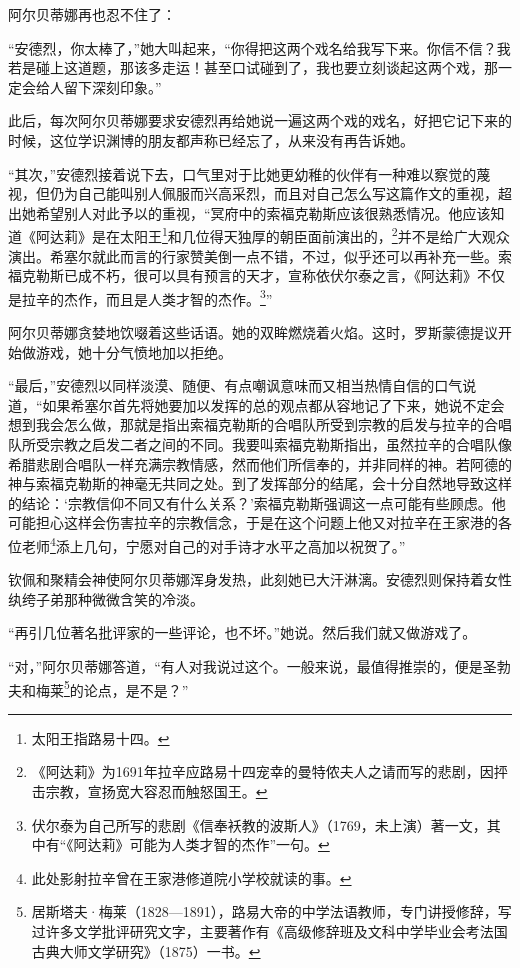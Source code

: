 \par 阿尔贝蒂娜再也忍不住了：
\par “安德烈，你太棒了，”她大叫起来，“你得把这两个戏名给我写下来。你信不信？我若是碰上这道题，那该多走运！甚至口试碰到了，我也要立刻谈起这两个戏，那一定会给人留下深刻印象。”
\par 此后，每次阿尔贝蒂娜要求安德烈再给她说一遍这两个戏的戏名，好把它记下来的时候，这位学识渊博的朋友都声称已经忘了，从来没有再告诉她。
\par “其次，”安德烈接着说下去，口气里对于比她更幼稚的伙伴有一种难以察觉的蔑视，但仍为自己能叫别人佩服而兴高采烈，而且对自己怎么写这篇作文的重视，超出她希望别人对此予以的重视，“冥府中的索福克勒斯应该很熟悉情况。他应该知道《阿达莉》是在太阳王\footnote{太阳王指路易十四。}和几位得天独厚的朝臣面前演出的，\footnote{《阿达莉》为1691年拉辛应路易十四宠幸的曼特侬夫人之请而写的悲剧，因抨击宗教，宣扬宽大容忍而触怒国王。}并不是给广大观众演出。希塞尔就此而言的行家赞美倒一点不错，不过，似乎还可以再补充一些。索福克勒斯已成不朽，很可以具有预言的天才，宣称依伏尔泰之言，《阿达莉》不仅是拉辛的杰作，而且是人类才智的杰作。\footnote{伏尔泰为自己所写的悲剧《信奉袄教的波斯人》（1769，未上演）著一文，其中有“《阿达莉》可能为人类才智的杰作”一句。}”
\par 阿尔贝蒂娜贪婪地饮啜着这些话语。她的双眸燃烧着火焰。这时，罗斯蒙德提议开始做游戏，她十分气愤地加以拒绝。
\par “最后，”安德烈以同样淡漠、随便、有点嘲讽意味而又相当热情自信的口气说道，“如果希塞尔首先将她要加以发挥的总的观点都从容地记了下来，她说不定会想到我会怎么做，那就是指出索福克勒斯的合唱队所受到宗教的启发与拉辛的合唱队所受宗教之启发二者之间的不同。我要叫索福克勒斯指出，虽然拉辛的合唱队像希腊悲剧合唱队一样充满宗教情感，然而他们所信奉的，并非同样的神。若阿德的神与索福克勒斯的神毫无共同之处。到了发挥部分的结尾，会十分自然地导致这样的结论：‘宗教信仰不同又有什么关系？’索福克勒斯强调这一点可能有些顾虑。他可能担心这样会伤害拉辛的宗教信念，于是在这个问题上他又对拉辛在王家港的各位老师\footnote{此处影射拉辛曾在王家港修道院小学校就读的事。}添上几句，宁愿对自己的对手诗才水平之高加以祝贺了。”
\par 钦佩和聚精会神使阿尔贝蒂娜浑身发热，此刻她已大汗淋漓。安德烈则保持着女性纨绔子弟那种微微含笑的冷淡。
\par “再引几位著名批评家的一些评论，也不坏。”她说。然后我们就又做游戏了。
\par “对，”阿尔贝蒂娜答道，“有人对我说过这个。一般来说，最值得推崇的，便是圣勃夫和梅莱\footnote{居斯塔夫·梅莱（1828—1891），路易大帝的中学法语教师，专门讲授修辞，写过许多文学批评研究文字，主要著作有《高级修辞班及文科中学毕业会考法国古典大师文学研究》（1875）一书。}的论点，是不是？”
